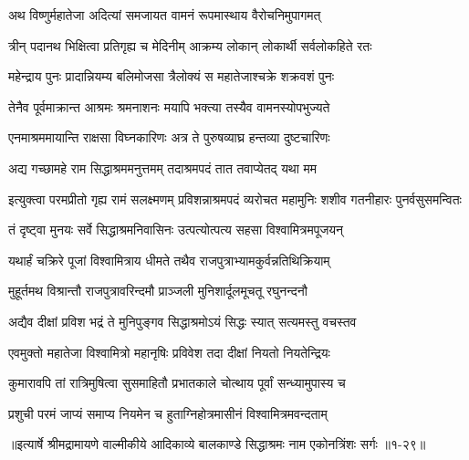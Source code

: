 \twolineshloka
{अथ विष्णुर्महातेजा अदित्यां समजायत}
{वामनं रूपमास्थाय वैरोचनिमुपागमत्} %

\twolineshloka
{त्रीन् पदानथ भिक्षित्वा प्रतिगृह्य च मेदिनीम्}
{आक्रम्य लोकान् लोकार्थी सर्वलोकहिते रतः} %

\twolineshloka
{महेन्द्राय पुनः प्रादान्नियम्य बलिमोजसा}
{त्रैलोक्यं स महातेजाश्चक्रे शक्रवशं पुनः} %

\twolineshloka
{तेनैव पूर्वमाक्रान्त आश्रमः श्रमनाशनः}
{मयापि भक्त्या तस्यैव वामनस्योपभुज्यते} %

\twolineshloka
{एनमाश्रममायान्ति राक्षसा विघ्नकारिणः}
{अत्र ते पुरुषव्याघ्र हन्तव्या दुष्टचारिणः} %

\twolineshloka
{अद्य गच्छामहे राम सिद्धाश्रममनुत्तमम्}
{तदाश्रमपदं तात तवाप्येतद् यथा मम} %

\threelineshloka
{इत्युक्त्वा परमप्रीतो गृह्य रामं सलक्ष्मणम्}
{प्रविशन्नाश्रमपदं व्यरोचत महामुनिः}
{शशीव गतनीहारः पुनर्वसुसमन्वितः} %

\twolineshloka
{तं दृष्ट्वा मुनयः सर्वे सिद्धाश्रमनिवासिनः}
{उत्पत्योत्पत्य सहसा विश्वामित्रमपूजयन्} %

\twolineshloka
{यथार्हं चक्रिरे पूजां विश्वामित्राय धीमते}
{तथैव राजपुत्राभ्यामकुर्वन्नतिथिक्रियाम्} %

\twolineshloka
{मुहूर्तमथ विश्रान्तौ राजपुत्रावरिन्दमौ}
{प्राञ्जली मुनिशार्दूलमूचतू रघुनन्दनौ} %

\twolineshloka
{अद्यैव दीक्षां प्रविश भद्रं ते मुनिपुङ्गव}
{सिद्धाश्रमोऽयं सिद्धः स्यात् सत्यमस्तु वचस्तव} %

\twolineshloka
{एवमुक्तो महातेजा विश्वामित्रो महानृषिः}
{प्रविवेश तदा दीक्षां नियतो नियतेन्द्रियः} %

\twolineshloka
{कुमारावपि तां रात्रिमुषित्वा सुसमाहितौ}
{प्रभातकाले चोत्थाय पूर्वां सन्ध्यामुपास्य च} %

\twolineshloka
{प्रशुची परमं जाप्यं समाप्य नियमेन च}
{हुताग्निहोत्रमासीनं विश्वामित्रमवन्दताम्} %


॥इत्यार्षे श्रीमद्रामायणे वाल्मीकीये आदिकाव्ये बालकाण्डे सिद्धाश्रमः नाम एकोनत्रिंशः सर्गः ॥१-२९॥
